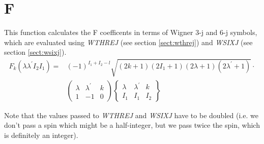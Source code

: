 \section{F}
\label{sect:f}

\noindent This function calculates the F coefficents in terms of Wigner 3-j
and 6-j symbols, which are evaluated using {\em WTHREJ} (see section
\ref{sect:wthrej}) and {\em WSIXJ} (see section \ref{sect:wsixj}).\\

\begin{eqnarray}
F_k(\lambda \lambda^\prime I_2 I_1) =& (-1)^{I_1 + I_2 - l} \sqrt{(2 k + 1)
(2 I_1 + 1) (2 \lambda + 1) (2 \lambda^\prime + 1)} \cdot \nonumber\\
%
&\begin{pmatrix}
\lambda & \lambda^\prime & k\\
1 & -1 & 0
\end{pmatrix}
%
\begin{Bmatrix}
\lambda & \lambda^\prime & k\\
I_1 & I_1 & I_2
\end{Bmatrix}
\end{eqnarray}

\noindent Note that the values passed to {\em WTHREJ} and {\em WSIXJ} have
to be doubled (i.e. we don't pass a spin which might be a half-integer, but
we pass twice the spin, which is definitely an integer).\\
